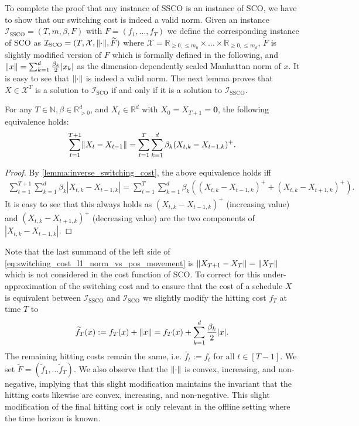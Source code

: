 To complete the proof that any instance of SSCO is an instance of SCO, we have to show that our switching cost is indeed a valid norm. Given an instance $\mathcal{I}_{\text{SSCO}} = (T, m, \beta, F)$ with $F = (f_1, \dots, f_T)$ we define the corresponding instance of SCO as $\mathcal{I}_{\text{SCO}} = (T, \mathcal{X}, \lVert\cdot\rVert, \widetilde{F})$ where $\mathcal{X} = \mathbb{R}_{\geq 0, \leq m_0} \times \dots \times \mathbb{R}_{\geq 0, \leq m_d}$, $\widetilde{F}$ is slightly modified version of $F$ which is formally defined in the following, and $\lVert x\rVert = \sum_{k=1}^d \frac{\beta_k}{2} |x_k|$ as the dimension-dependently scaled Manhattan norm of $x$. It is easy to see that $\lVert\cdot\rVert$ is indeed a valid norm. The next lemma proves that $X \in \mathcal{X}^T$ is a solution to $\mathcal{I}_{\text{SCO}}$ if and only if it is a solution to $\mathcal{I}_{\text{SSCO}}$.

\begin{lemma}\label{lemma:switching_cost_l1_norm_vs_pos_movement}
For any $T \in \mathbb{N}, \beta \in \mathbb{R}_{>0}^d$, and $X_t \in \mathbb{R}^d$ with $X_0 = X_{T+1} = \mathbf{0}$, the following equivalence holds:
\begin{align}\label{eq:switching_cost_l1_norm_vs_pos_movement}
    \sum_{t=1}^{T+1} \lVert X_t - X_{t-1}\rVert = \sum_{t=1}^T \sum_{k=1}^d \beta_k (X_{t,k} - X_{t-1,k})^+.
\end{align}
\end{lemma}
\begin{proof}
By \autoref{lemma:inverse_switching_cost}, the above equivalence holds iff \begin{align*}
    \sum_{t=1}^{T+1} \sum_{k=1}^d \beta_k |X_{t,k} - X_{t-1,k}| = \sum_{t=1}^T \sum_{k=1}^d \beta_k ((X_{t,k} - X_{t-1,k})^+ + (X_{t,k} - X_{t+1,k})^+).
\end{align*}
It is easy to see that this always holds as $(X_{t,k} - X_{t-1,k})^+$ (increasing value) and $(X_{t,k} - X_{t+1,k})^+$ (decreasing value) are the two components of $|X_{t,k} - X_{t-1,k}|$.
\end{proof}

Note that the last summand of the left side of \autoref{eq:switching_cost_l1_norm_vs_pos_movement} is $\lVert X_{T+1} - X_T\rVert = \lVert X_T\rVert$ which is not considered in the cost function of SCO. To correct for this under-approximation of the switching cost and to ensure that the cost of a schedule $X$ is equivalent between $\mathcal{I}_{\text{SSCO}}$ and $\mathcal{I}_{\text{SCO}}$ we slightly modify the hitting cost $f_T$ at time $T$ to \begin{align*}
    \widetilde{f}_T(x) := f_T(x) + \lVert x\rVert = f_T(x) + \sum_{k=1}^d \frac{\beta_k}{2} |x|.
\end{align*} The remaining hitting costs remain the same, i.e. $\widetilde{f_t} := f_t$ for all $t \in [T-1]$. We set $\widetilde{F} = (\widetilde{f}_1, \dots \widetilde{f}_T)$. We also observe that the $\lVert\cdot\rVert$ is convex, increasing, and non-negative, implying that this slight modification maintains the invariant that the hitting costs likewise are convex, increasing, and non-negative. This slight modification of the final hitting cost is only relevant in the offline setting where the time horizon is known.


